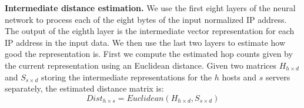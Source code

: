\textbf{Intermediate distance estimation.} We use the first eight layers of the neural network to process each of the eight bytes of the input normalized IP address. The output of the eighth layer is the intermediate vector representation for each IP address in the input data. 
We then use the last two layers to estimate how good the representation is.
First we compute the estimated hop counts given by the current representation using an Euclidean distance. 
Given two matrices $H_{h\times d}$ and $S_{s\times d}$ storing the intermediate representations for the $h$ hosts and $s$ servers separately, the estimated distance matrix is:
\begin{equation} 
\label{equ:distance} 
Dist_{h\times s}=Euclidean(H_{h\times d}, S_{s\times d}) 
\end{equation}




